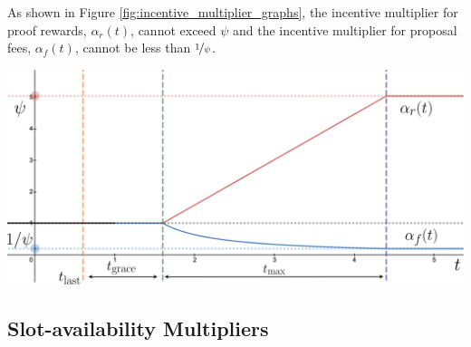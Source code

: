 \documentclass[9pt,oneside]{amsart}
\newenvironment{Figure}
  {\par\medskip\noindent\minipage{\linewidth}}
  {\endminipage\par\medskip}
\begin{document}
\begin{multicols}{2}

As shown in Figure \ref{fig:incentive_multiplier_graphs}, the incentive multiplier for proof rewards, $\alpha_r(t)$, cannot exceed $\psi$ and the incentive multiplier for proposal fees, $\alpha_f(t)$, cannot be less than $\nicefrac{1}{\psi}$.

\begin{Figure}
 \centering
 \includegraphics[width=\linewidth]{fig/incentive_graph.png}
 \label{fig:incentive_multiplier_graphs}
 
\end{Figure}

\subsection{Slot-availability Multipliers}
\label{sec:slot_availability_multipliers}





\end{multicols}
\end{document}
